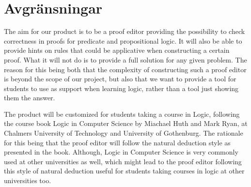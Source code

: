 \section {Avgränsningar}

The aim for our product is to be a proof editor providing the possibility to check correctness in proofs for 
predicate and propositional logic. It will also be able to 
provide hints on rules that could be applicative when constructing 
a certain proof. 
What it will not do is to provide a full solution for any given problem. 
The reason for this being both that the complexity of constructing 
such a proof editor is beyond the scope of our project, 
but also that we want to provide a tool for students to use 
as support when learning logic, rather than a tool just showing 
them the answer.

The product will be customized for students taking a course in Logic, 
following the course book Logic in Computer Science by Miachael Huth 
and Mark Ryan, at Chalmers University of Technology and University 
of Gothenburg. The rationale for this being that the proof editor will 
follow the natural deduction style as presented in the book. Although, 
Logic in Computer Science is very commonly used at other universities as well, 
which might lead to the proof editor following this style of natural deduction 
useful for students taking courses in logic at other universities too.
